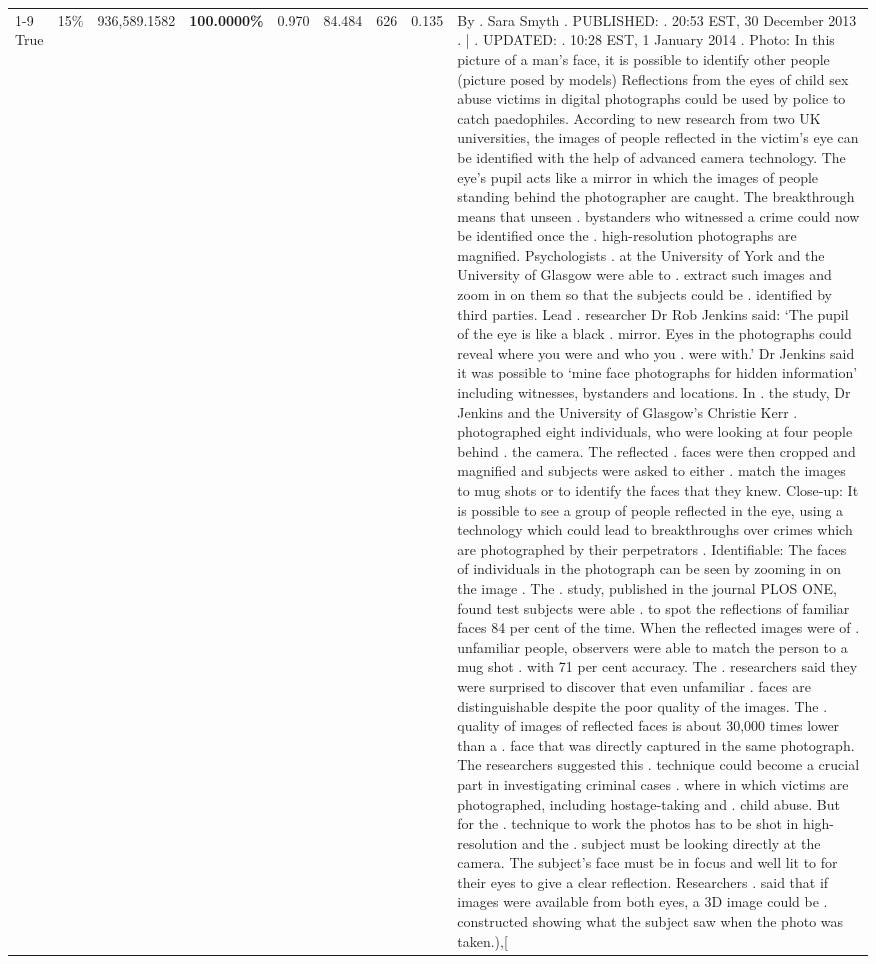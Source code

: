 \begin{table}[H]
\begin{tabular}{lllrlllll}
\cline{1-9} \cline{2-9}
True & 15\% & 936,589.1582 & \bfseries \color{red} 100.0000\% & 0.970 & 84.484 & 626 & 0.135 & By . Sara Smyth . PUBLISHED: . 20:53 EST, 30 December 2013 . | . UPDATED: . 10:28 EST, 1 January 2014 . Photo: In this picture of a man's face, it is possible to identify other people (picture posed by models) Reflections from the eyes of child sex abuse victims in digital photographs could be used by police to catch paedophiles. According to new research from two UK universities, the images of people reflected in the victim's eye can be identified with the help of advanced camera technology. The eye's pupil acts like a mirror in which the images of people standing behind the photographer are caught. The breakthrough means that unseen . bystanders who witnessed a crime could now be identified once the . high-resolution photographs are magnified. Psychologists . at the University of York and the University of Glasgow were able to . extract such images and zoom in on them so that the subjects could be . identified by third parties. Lead . researcher Dr Rob Jenkins said: ‘The pupil of the eye is like a black . mirror. Eyes in the photographs could reveal where you were and who you . were with.' Dr Jenkins said it was possible to ‘mine face photographs for hidden information' including witnesses, bystanders and locations. In . the study, Dr Jenkins and the University of Glasgow's Christie Kerr . photographed eight individuals, who were looking at four people behind . the camera. The reflected . faces were then cropped and magnified and subjects were asked to either . match the images to mug shots or to identify the faces that they knew. Close-up: It is possible to see a group of people reflected in the eye, using a technology which could lead to breakthroughs over crimes which are photographed by their perpetrators . Identifiable: The faces of individuals in the photograph can be seen by zooming in on the image . The . study, published in the journal PLOS ONE, found test subjects were able . to spot the reflections of familiar faces 84 per cent of the time. When the reflected images were of . unfamiliar people, observers were able to match the person to a mug shot . with 71 per cent accuracy. The . researchers said they were surprised to discover that even unfamiliar . faces are distinguishable despite the poor quality of the images. The . quality of images of reflected faces is about 30,000 times lower than a . face that was directly captured in the same photograph. The researchers suggested this . technique could become a crucial part in investigating criminal cases . where in which victims are photographed, including hostage-taking and . child abuse. But for the . technique to work the photos has to be shot in high-resolution and the . subject must be looking directly at the camera. The subject's face must be in focus and well lit to for their eyes to give a clear reflection. Researchers . said that if images were available from both eyes, a 3D image could be . constructed showing what the subject saw when the photo was taken.),[ \\

\end{tabular}
\end{table}

